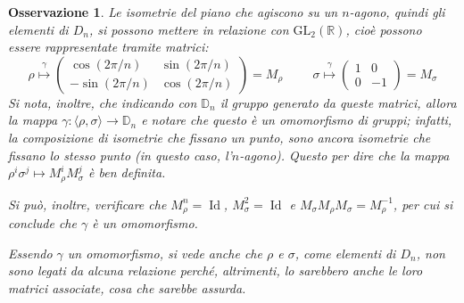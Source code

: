 \documentclass[11pt]{scrartcl}
\theoremstyle{style1}
\newtheorem{osservazione}{Osservazione}[section]
\numberwithin{equation}{subsection}
\begin{document}
\begin{osservazione}
Le isometrie del piano che agiscono su un $n$-agono, quindi gli elementi di $D_n$, si possono mettere in relazione con $\mathrm{GL} _2(\mathbb{R})$, cio\`e possono essere rappresentate tramite matrici:
\begin{equation}
	\rho  \stackrel{\gamma}{\longmapsto} \begin{pmatrix} \displaystyle \cos \left(2\pi / n\right) & \sin \left(2\pi / n\right) \\ - \sin \left( 2\pi / n\right) & \cos (2\pi / n) \end{pmatrix}=M_\rho  \hspace{1cm}\sigma \stackrel{\gamma}{\longmapsto} \begin{pmatrix} 1 & 0 \\ 0 & - 1 \end{pmatrix} = M_\sigma 
\end{equation}
Si nota, inoltre, che indicando con $\mathbb{D}_n$ il gruppo generato da queste matrici, allora la mappa $\gamma : \langle \rho ,\sigma  \rangle\to \mathbb{D}_n$ e notare che questo \`e un omomorfismo di gruppi; infatti, la composizione di isometrie che fissano un punto, sono ancora isometrie che fissano lo stesso punto (in questo caso, l'$n$-agono).
Questo per dire che la mappa $\rho ^i \sigma ^j \mapsto M_\rho ^i M_\sigma ^j$ \`e ben definita.

Si pu\`o, inoltre, verificare che $M_\rho ^n = \operatorname{Id} $, $M_\sigma ^2 = \operatorname{Id} $ e $M_\sigma M_\rho M_\sigma = M_\rho ^{-1}$, per cui si conclude che $\gamma$ \`e un omomorfismo.

Essendo $\gamma$ un omomorfismo, si vede anche che $\rho $ e $\sigma $, come elementi di $D_n$, non sono legati da alcuna relazione perch\'e, altrimenti, lo sarebbero anche le loro matrici associate, cosa che sarebbe assurda. 
\end{osservazione}
\end{document}
